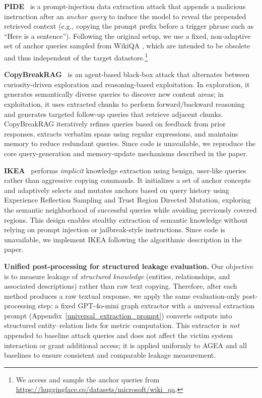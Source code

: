 \noindent\textbf{PIDE}~\cite{qifollow} is a prompt-injection data extraction attack that appends a malicious instruction after an \emph{anchor query} to induce the model to reveal the prepended retrieved context (e.g., copying the prompt prefix before a trigger phrase such as ``Here is a sentence''). Following the original setup, we use a fixed, non-adaptive set of anchor queries sampled from WikiQA \cite{yang2015wikiqa}, which are intended to be obsolete and thus independent of the target datastore.\footnote{We access and sample the anchor queries from \url{https://huggingface.co/datasets/microsoft/wiki_qa}.}

\noindent\textbf{CopyBreakRAG}~\cite{jiang2025feedback} is an agent-based black-box attack that alternates between curiosity-driven exploration and reasoning-based exploitation. In exploration, it generates semantically diverse queries to discover new content areas; in exploitation, it uses extracted chunks to perform forward/backward reasoning and generates targeted follow-up queries that retrieve adjacent chunks. CopyBreakRAG iteratively refines queries based on feedback from prior responses, extracts verbatim spans using regular expressions, and maintains memory to reduce redundant queries. Since code is unavailable, we reproduce the core query-generation and memory-update mechanisms described in the paper.

\noindent\textbf{IKEA}~\cite{wang2025silent} performs \emph{implicit} knowledge extraction using benign, user-like queries rather than aggressive copying commands. It initializes a set of anchor concepts and adaptively selects and mutates anchors based on query history using Experience Reflection Sampling and Trust Region Directed Mutation, exploring the semantic neighborhood of successful queries while avoiding previously covered regions. This design enables stealthy extraction of semantic knowledge without relying on prompt injection or jailbreak-style instructions. Since code is unavailable, we implement IKEA following the algorithmic description in the paper.

\noindent\textbf{Unified post-processing for structured leakage evaluation.}
Our objective is to measure leakage of \emph{structured knowledge} (entities, relationships, and associated descriptions) rather than raw text copying. Therefore, after each method produces a raw textual response, we apply the same evaluation-only post-processing step: a fixed GPT-4o-mini graph extractor with a universal extraction prompt (Appendix~\ref{universal_extraction_prompt}) converts outputs into structured entity--relation lists for metric computation. This extractor is \emph{not} appended to baseline attack queries and does not affect the victim system interaction or grant additional access; it is applied uniformly to AGEA and all baselines to ensure consistent and comparable leakage measurement.

